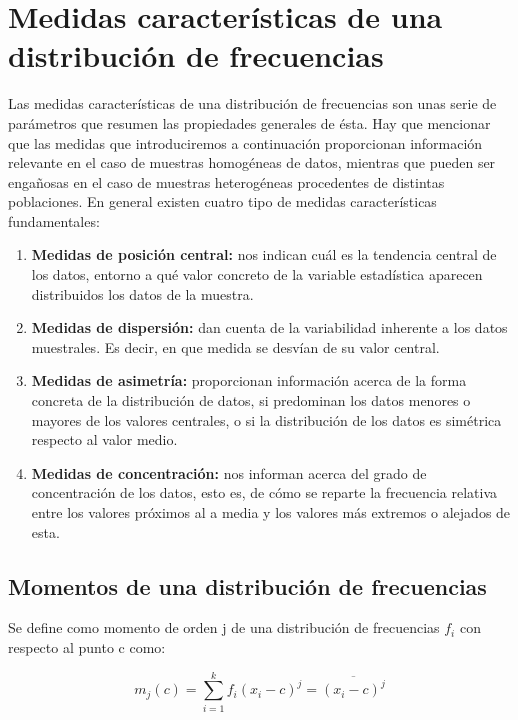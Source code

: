 \documentclass[12pt,a4paper]{book}
\begin{document}
\section{Medidas características de una distribución de frecuencias}

Las medidas características de una distribución de frecuencias son unas serie de parámetros que resumen las propiedades generales de ésta. Hay que mencionar que las medidas que introduciremos a continuación proporcionan información relevante en el caso de muestras homogéneas de datos, mientras que pueden ser engañosas en el caso de muestras heterogéneas procedentes de distintas poblaciones. En general existen cuatro tipo de medidas características fundamentales:

\begin{enumerate}
\item \textbf{Medidas de posición central:} nos indican cuál es la tendencia central de los datos, entorno a qué valor concreto de la variable estadística aparecen distribuidos los datos de la muestra. 

\item \textbf{Medidas de dispersión:} dan cuenta de la variabilidad inherente a los datos muestrales. Es decir, en que medida se desvían de su valor central.

\item \textbf{Medidas de asimetría:} proporcionan información acerca de la forma concreta de la distribución de datos, si predominan los datos menores o mayores de los valores centrales, o si la distribución de los datos es simétrica respecto al valor medio.

\item \textbf{Medidas de concentración:} nos informan acerca del grado de concentración de los datos, esto es, de cómo se reparte la frecuencia relativa entre los valores próximos al a media y los valores más extremos o alejados de esta. 


\end{enumerate}

\subsection{Momentos de una distribución de frecuencias}

Se define como momento de orden j de una distribución de frecuencias $f_i$ con respecto al punto c como: 

\begin{equation}
m_j(c) = \sum_{i=1}^{k} f_i (x_i-c)^j = \overline{(x_i-c)^j}
\end{equation}
\end{document}
